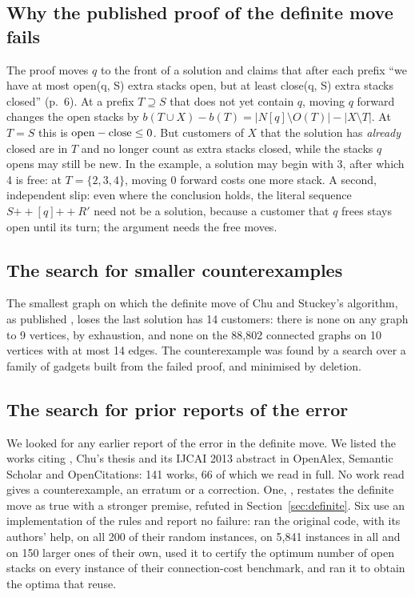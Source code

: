 \subsection{Why the published proof of the definite move fails}
\label{app:whyfails}

The proof moves $q$ to the front of a
solution and claims that after each prefix ``we have at most open(q, S) extra
stacks open, but at least close(q, S) extra stacks closed'' (p.~6). At a prefix
$T\supseteq S$ that does not yet contain $q$, moving $q$ forward changes the open
stacks by $b(T\cup X)-b(T) = |N[q]\setminus O(T)|-|X\setminus T|$. At $T=S$ this
is $\mathrm{open}-\mathrm{close}\le0$. But customers of $X$ that the solution has \emph{already}
closed are in $T$ and no longer count as extra stacks closed, while the stacks
$q$ opens may still be new. In the example, a solution may begin with 3, after
which 4 is free: at $T=\{2,3,4\}$, moving 0 forward costs one more stack. A
second, independent slip: even where the conclusion holds, the literal sequence
$S \mathbin{+\!\!+} [q] \mathbin{+\!\!+} R'$ need not be a solution, because a
customer that $q$ frees stays open until its turn; the argument needs the free
moves.

\subsection{The search for smaller counterexamples}
\label{app:minimality}

The smallest graph on which the definite move of Chu and Stuckey's algorithm, as
published \citep[Theorem~1]{ChuStuckey2009}, loses the last solution has 14
customers:
there is none on any graph to 9 vertices, by exhaustion, and none on the 88,802
connected graphs on 10 vertices with at most 14 edges. The counterexample was
found by a search over a family of gadgets built from the failed proof, and
minimised by deletion.

\subsection{The search for prior reports of the error}
\label{app:prior}

We looked for any earlier report of the error in the definite move. We
listed the works citing \citet{ChuStuckey2009}, Chu's thesis and its IJCAI 2013
abstract in OpenAlex, Semantic Scholar and OpenCitations: 141 works, 66 of which we read in full. No work read gives a counterexample, an erratum or a
correction. One, \citet{Fink2012}, restates the definite move as true with a
stronger premise, refuted in Section~\ref{sec:definite}. Six use an
implementation of the rules and report no failure:
\citet{DeGiovanni2010,DeGiovanni2013a} ran the original code, with its
authors' help, on all 200 of their random instances, on 5,841 instances in all
and on 150 larger ones of their own, \citet{DeGiovanni2013b} used it to
certify the optimum number of open stacks on every instance of their
connection-cost benchmark, and \citet{Frinhani2018} ran it to obtain the
optima that \citet{MartinYanassePinto2022} reuse.

